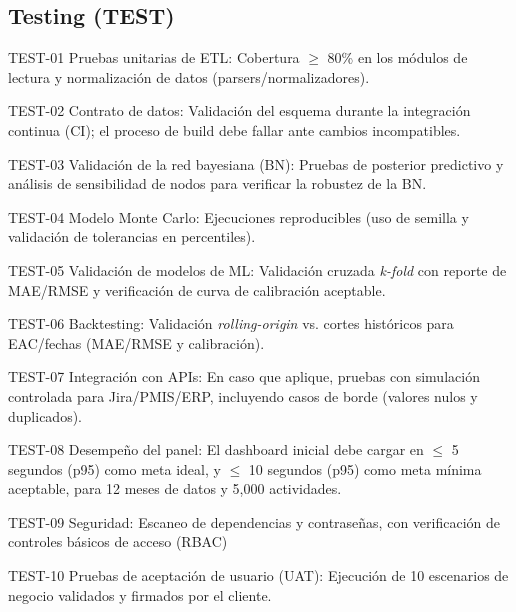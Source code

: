 \documentclass[12pt]
{charter}
\begin{document}
\subsection{Testing (TEST)}
\begin{description}
  \item TEST-01 Pruebas unitarias de ETL: Cobertura $\geq$ 80\% en los módulos de lectura y normalización de datos (parsers/normalizadores).

  \item TEST-02 Contrato de datos: Validación del esquema durante la integración continua (CI); el proceso de build debe fallar ante cambios incompatibles.

  \item TEST-03 Validación de la red bayesiana (BN): Pruebas de posterior predictivo y análisis de sensibilidad de nodos para verificar la robustez de la BN.

  \item TEST-04 Modelo Monte Carlo: Ejecuciones reproducibles (uso de semilla y validación de tolerancias en percentiles).

  \item TEST-05 Validación de modelos de ML: Validación cruzada \textit{k-fold} con reporte de MAE/RMSE y verificación de curva de calibración aceptable.

  \item TEST-06 Backtesting: Validación \textit{rolling-origin} vs. cortes históricos para EAC/fechas (MAE/RMSE y calibración).

  \item TEST-07 Integración con APIs: En caso que aplique, pruebas con simulación controlada para Jira/PMIS/ERP, incluyendo casos de borde (valores nulos y duplicados).

  \item TEST-08 Desempeño del panel: El dashboard inicial debe cargar en $\leq$ 5 segundos (p95) como meta ideal, y $\leq$ 10 segundos (p95) como meta mínima aceptable, para 12 meses de datos y 5,000 actividades.

  \item TEST-09 Seguridad: Escaneo de dependencias y contraseñas, con verificación de controles básicos de acceso (RBAC)

  \item TEST-10 Pruebas de aceptación de usuario (UAT): Ejecución de 10 escenarios de negocio validados y firmados por el cliente.

\end{description}
\end{document}

